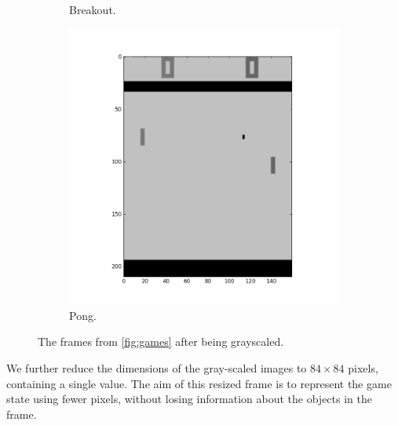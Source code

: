 \documentclass[11pt]{article}
\begin{document}
\begin{figure}[H]
\begin{subfigure}{.3\textwidth}
        \caption{Breakout.}
        \label{fig:scanlike}
    \end{subfigure}
    \begin{subfigure}{.3\textwidth}
        \centering
        \includegraphics[scale=0.25]{include/pong_1_gray.png}
        \caption{Pong.}
        \label{fig:scan}
    \end{subfigure}
    \caption{The frames from \ref{fig:games} after being grayscaled.}
     \label{fig:grays}
\end{figure}

We further reduce the dimensions of the gray-scaled images
to $84 \times 84$ pixels, containing a single value.
The aim of this resized frame is to represent the game state
using fewer pixels, without losing information about the objects
in the frame.
\end{document}
